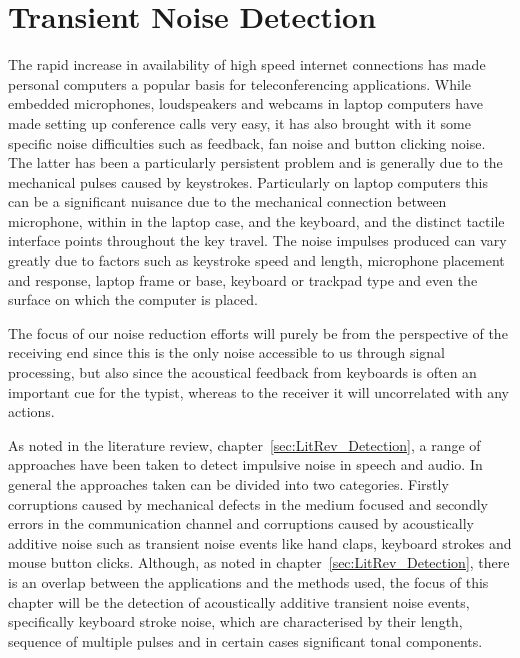 \chapter{Transient Noise Detection}\label{ch:TransientNoiseDetection}

\ifpdf
    \graphicspath{{Chapter5_TransNoiseDet/Chapter5Figs/PNG/}{Chapter5_TransNoiseDet/Chapter5Figs/PDF/}{Chapter5_TransNoiseDet/Chapter5Figs/}{Chapter5_TransNoiseDet/Chapter5Figs/NoiseBurstModel/}{Chapter5_TransNoiseDet/Chapter5Figs/ARFilterMethod/}}
\else
    \graphicspath{{Chapter5_TransNoiseDet/Chapter5Figs/EPS/}{Chapter5_TransNoiseDet/Chapter5Figs/}}
\fi

The rapid increase in availability of high speed internet connections has made personal computers a popular basis for teleconferencing applications. While embedded microphones, loudspeakers and webcams in laptop computers have made setting up conference calls very easy, it has also brought with it some specific noise difficulties such as feedback, fan noise and button clicking noise. The latter has been a particularly persistent problem and is generally due to the mechanical pulses caused by keystrokes. Particularly on laptop computers this can be a significant nuisance due to the mechanical connection between microphone, within in the laptop case, and the keyboard, and the distinct tactile interface points throughout the key travel. The noise impulses produced can vary greatly due to factors such as keystroke speed and length, microphone placement and response, laptop frame or base, keyboard or trackpad type and even the surface on which the computer is placed.

The focus of our noise reduction efforts will purely be from the perspective of the receiving end since this is the only noise accessible to us through signal processing, but also since the acoustical feedback from keyboards is often an important cue for the typist, whereas to the receiver it will uncorrelated with any actions.

As noted in the literature review, chapter~\ref{sec:LitRev_Detection}, a range of approaches have been taken to detect impulsive noise in speech and audio. In general the approaches taken can be divided into two categories. Firstly corruptions caused by mechanical defects in the medium focused and secondly errors in the communication channel and corruptions caused by acoustically additive noise such as transient noise events like hand claps, keyboard strokes and mouse button clicks. Although, as noted in chapter~\ref{sec:LitRev_Detection}, there is an overlap between the applications and the methods used, the focus of this chapter will be the detection of acoustically additive transient noise events, specifically keyboard stroke noise, which are characterised by their length, sequence of multiple pulses and in certain cases significant tonal components.

